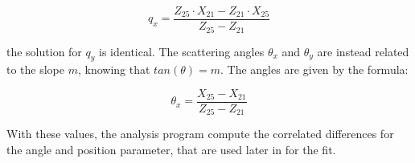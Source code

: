 \begin{appendices}
\begin{equation}
q_{x} = \dfrac{Z_{25} \cdot X_{21} - Z_{21} \cdot X_{25}}{Z_{25} - Z_{21}}
\end{equation} 

the solution for $q_{y}$ is identical. The scattering angles $\theta_{x}$ and $\theta_{y}$ are instead related to the slope $m$, knowing that $tan(\theta) = m$. The angles are given by the formula:

\begin{equation}
\theta_{x} = \dfrac{X_{25} - X_{21}}{Z_{25} - Z_{21}}
\end{equation}

With these values, the analysis program compute the correlated differences for the angle and position parameter, that are used later in for the fit.


\end{appendices}